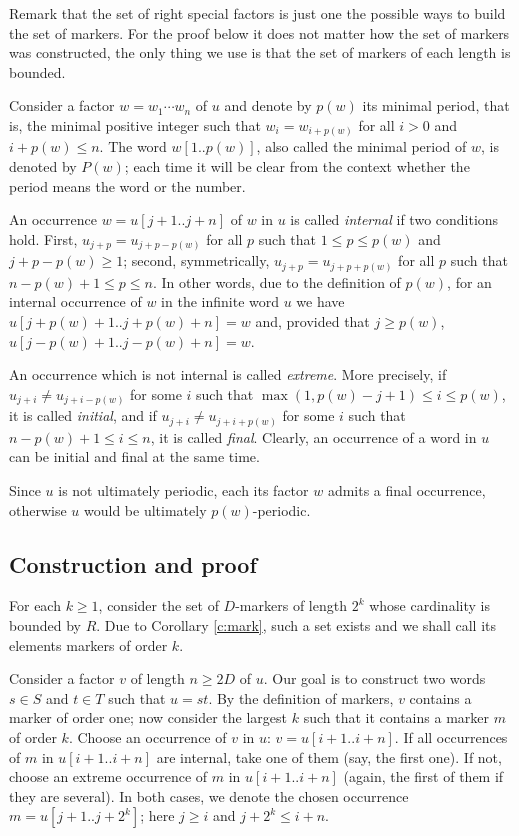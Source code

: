 \documentclass[runningheads,envcountsect,envcountsame]{llncs}
\begin{document}
Remark that the set of right special factors is just one the
possible ways to build the set of markers. For the proof below it
does not matter how the set of markers was constructed, the only
thing we use is that the set of markers of each length is bounded. 

Consider a factor $w=w_1\cdots w_{n}$ of $u$ and denote by $p(w)$ its minimal period, that is,
the minimal positive integer such that $w_i=w_{i+p(w)}$ for all $i>0$ and $i+p(w)\leq n$.
The word $w[1..p(w)]$, also called the minimal period of $w$, is denoted by $P(w)$; each time it will be clear from the context whether the period means the word or the number.

An occurrence $w=u[j+1..j+n]$ of $w$ in $u$ is called {\it internal} if two conditions hold. First, $u_{j+p}=u_{j+p-p(w)}$ for all $p$ such that $1 \leq p\leq p(w)$ and $j+p-p(w)\geq 1$; second, symmetrically, $u_{j+p}=u_{j+p+p(w)}$ for all $p$ such that $n-p(w)+1 \leq p \leq n$. In other words, due to the definition of $p(w)$, for an internal occurrence of $w$ in the infinite word $u$ we have $u[j+p(w)+1..j+p(w)+n]=w$ and, provided that $j \geq p(w)$, $u[j-p(w)+1..j-p(w)+n]=w$.

An occurrence which is not internal is called {\it extreme}. More precisely, if $u_{j+i}\neq u_{j+i-p(w)}$ for some $i$ such that $\max(1,p(w)-j+1)\leq i \leq p(w)$, it is called {\it initial},
and if $u_{j+i}\neq u_{j+i+p(w)}$ for some $i$ such that $n-p(w)+1 \leq i \leq n$, it is called {\it final}. Clearly, an occurrence of a word in $u$ can be initial and final at the same time.

Since $u$ is not ultimately periodic, each its factor $w$ admits a final occurrence, otherwise $u$ would be ultimately $p(w)$-periodic.

\subsection{Construction and proof}
For each $k \geq 1$, consider the set of $D$-markers of length $2^k$ whose cardinality is bounded by $R$. Due to Corollary \ref{c:mark}, such a set exists and we shall call its elements markers of order $k$.

Consider a factor $v$ of length $n\geq 2 D$ of $u$. Our goal is to construct two words $s \in S$ and $t \in T$ such that $u=st$. By the definition of markers, $v$ contains a marker of order one; now consider the largest $k$ such that it contains a marker $m$ of order $k$. Choose an occurrence of $v$ in $u$: $v=u[i+1..i+n]$. If all occurrences of $m$ in $u[i+1..i+n]$ are internal, take one of them (say, the first one). If not, choose an extreme occurrence of $m$ in $u[i+1..i+n]$ (again, the first of them if they are several). In both cases, we denote the chosen occurrence $m=u[j+1..j+2^k]$; here $j\geq i$ and $j+2^k \leq i+n$.
\end{document}
